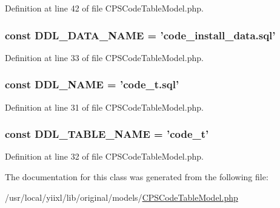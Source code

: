 Definition at line 42 of file CPSCodeTableModel.php.

\hypertarget{classCPSCodeTableModel_ac4ef63ea01237fca6e5977e7cf0ad6fa}{
\subsubsection[{DDL\_\-DATA\_\-NAME}]{\setlength{\rightskip}{0pt plus 5cm}const {\bf DDL\_\-DATA\_\-NAME} = 'code\_\-install\_\-data.sql'}}
\label{classCPSCodeTableModel_ac4ef63ea01237fca6e5977e7cf0ad6fa}


Definition at line 33 of file CPSCodeTableModel.php.

\hypertarget{classCPSCodeTableModel_a1e548fb71c67f7f778a311f3019b9ff3}{
\subsubsection[{DDL\_\-NAME}]{\setlength{\rightskip}{0pt plus 5cm}const {\bf DDL\_\-NAME} = 'code\_\-t.sql'}}
\label{classCPSCodeTableModel_a1e548fb71c67f7f778a311f3019b9ff3}


Definition at line 31 of file CPSCodeTableModel.php.

\hypertarget{classCPSCodeTableModel_aab7e20a5077f2a3b17ab9ae1ca8bd744}{
\subsubsection[{DDL\_\-TABLE\_\-NAME}]{\setlength{\rightskip}{0pt plus 5cm}const {\bf DDL\_\-TABLE\_\-NAME} = 'code\_\-t'}}
\label{classCPSCodeTableModel_aab7e20a5077f2a3b17ab9ae1ca8bd744}


Definition at line 32 of file CPSCodeTableModel.php.



The documentation for this class was generated from the following file:\begin{DoxyCompactItemize}
\item 
/usr/local/yiixl/lib/original/models/\hyperlink{CPSCodeTableModel_8php}{CPSCodeTableModel.php}\end{DoxyCompactItemize}
